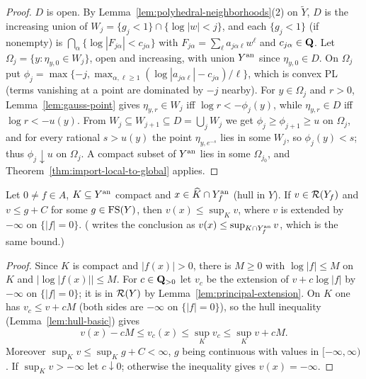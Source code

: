 \begin{proof}
$D$ is open. By Lemma~\ref{lem:polyhedral-neighborhoods}(2) on $\widetilde Y$, $D$ is the
increasing union of $W_j=\{g_j<1\}\cap\{\log|w|<j\}$, and each $\{g_j<1\}$ (if nonempty) is
$\bigcap_\alpha\{\log|F_{j\alpha}|<c_{j\alpha}\}$ with $F_{j\alpha}=\sum_\ell a_{j\alpha\ell}w^\ell$ and
$c_{j\alpha}\in\mathbf{Q}$. Let $\Omega_j=\{y:\eta_{y,0}\in W_j\}$, open and increasing, with union
$Y^{\mathrm{an}}$ since $\eta_{y,0}\in D$. On $\Omega_j$ put
$\phi_j=\max\{-j,\max_{\alpha,\ell\ge1}(\log|a_{j\alpha\ell}|-c_{j\alpha})/\ell\}$, which is convex PL
(terms vanishing at a point are dominated by $-j$ nearby). For $y\in\Omega_j$ and $r>0$,
Lemma~\ref{lem:gauss-point} gives $\eta_{y,r}\in W_j$ iff $\log r<-\phi_j(y)$, while
$\eta_{y,r}\in D$ iff $\log r<-u(y)$. From $W_j\subseteq W_{j+1}\subseteq D=\bigcup_jW_j$ we get
$\phi_j\ge\phi_{j+1}\ge u$ on $\Omega_j$, and for every rational $s>u(y)$ the point
$\eta_{y,e^{-s}}$ lies in some $W_j$, so $\phi_j(y)<s$; thus $\phi_j\downarrow u$ on $\Omega_j$. A
compact subset of $Y^{\mathrm{an}}$ lies in some $\Omega_{j_0}$, and Theorem~\ref{thm:import-local-to-global}
applies.
\end{proof}

\begin{lemma}\label{lem:principal-hull}
\leanok
{}
Let $0\ne f\in A$, $K\subseteq Y^{\mathrm{an}}$ compact and $x\in\widehat K\cap Y_f^{\mathrm{an}}$ (hull in $Y$). If
$v\in\mathcal{R}(Y_f)$ and $v\le g+C$ for some $g\in\mathrm{FS}(Y)$, then $v(x)\le\sup_Kv$, where $v$ is extended by
$-\infty$ on $\{|f|=0\}$. (\cite{FHX} writes the conclusion as $v(x)\le\sup_{K\cap Y_f^{\mathrm{an}}}v$, which is the
same bound.)
\end{lemma}

\begin{proof}
Since $K$ is compact and $|f(x)|>0$, there is $M\ge0$ with $\log|f|\le M$ on $K$ and
$|\log|f(x)||\le M$. For $c\in\mathbf{Q}_{>0}$ let $v_c$ be the extension of $v+c\log|f|$ by $-\infty$ on
$\{|f|=0\}$; it is in $\mathcal{R}(Y)$ by Lemma~\ref{lem:principal-extension}. On $K$ one has $v_c\le v+cM$
(both sides are $-\infty$ on $\{|f|=0\}$), so the hull inequality (Lemma~\ref{lem:hull-basic}) gives
\[
v(x)-cM\le v_c(x)\le\sup_Kv_c\le\sup_Kv+cM.
\]
Moreover $\sup_Kv\le\sup_Kg+C<\infty$, $g$ being continuous with values in $[-\infty,\infty)$. If
$\sup_Kv>-\infty$ let $c\downarrow0$; otherwise the inequality gives $v(x)=-\infty$.
\end{proof}

